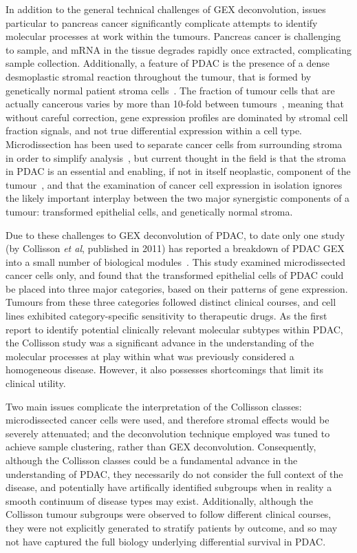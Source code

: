 \documentclass[dissertation.tex]{subfiles}
\begin{document}
In addition to the general technical challenges of \gls{GEX} deconvolution, issues particular to pancreas cancer significantly complicate attempts to identify molecular processes at work within the tumours.  Pancreas cancer is challenging to sample, and mRNA in the tissue degrades rapidly once extracted, complicating sample collection.  Additionally, a feature of \gls{PDAC} is the presence of a dense desmoplastic stromal reaction throughout the tumour, that is formed by genetically normal patient stroma cells~\cite{Mahadevan2007}.  The fraction of tumour cells that are actually cancerous varies by more than 10-fold between tumours~\cite{Biankin2012}, meaning that without careful correction, gene expression profiles are dominated by stromal cell fraction signals, and not true differential expression within a cell type.  Microdissection has been used to separate cancer cells from surrounding stroma in order to simplify analysis~\cite{Collisson2011}, but current thought in the field is that the stroma in \gls{PDAC} is an essential and enabling, if not in itself neoplastic, component of the tumour~\cite{Mahadevan2007}, and that the examination of cancer cell expression in isolation ignores the likely important interplay between the two major synergistic components of a tumour: transformed epithelial cells, and genetically normal stroma.

Due to these challenges to \gls{GEX} deconvolution of \gls{PDAC}, to date only one study (by Collisson \emph{et al}, published in 2011) has reported a breakdown of \gls{PDAC} \gls{GEX} into a small number of biological modules~\cite{Collisson2011}.  This study examined microdissected cancer cells only, and found that the transformed epithelial cells of \gls{PDAC} could be placed into three major categories, based on their patterns of gene expression.  Tumours from these three categories followed distinct clinical courses, and cell lines exhibited category-specific sensitivity to therapeutic drugs.  As the first report to identify potential clinically relevant molecular subtypes within \gls{PDAC}, the Collisson study was a significant advance in the understanding of the molecular processes at play within what was previously considered a homogeneous disease.  However, it also possesses shortcomings that limit its clinical utility.

Two main issues complicate the interpretation of the Collisson classes: microdissected cancer cells were used, and therefore stromal effects would be severely attenuated; and the deconvolution technique employed was tuned to achieve sample clustering, rather than \gls{GEX} deconvolution.  Consequently, although the Collisson classes could be a fundamental advance in the understanding of \gls{PDAC}, they necessarily do not consider the full context of the disease, and potentially have artifically identified subgroups when in reality a smooth continuum of disease types may exist.  Additionally, although the Collisson tumour subgroups were observed to follow different clinical courses, they were not explicitly generated to stratify patients by outcome, and so may not have captured the full biology underlying differential survival in \gls{PDAC}.
\end{document}

